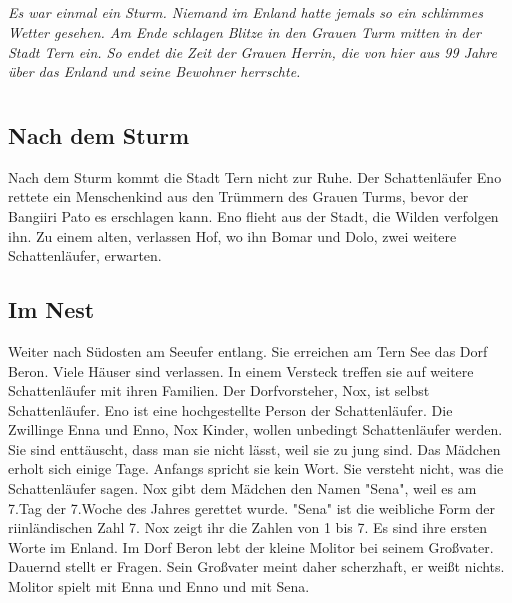 \documentclass[12pt,a4paper,onecolumn,twoside,ngerman]{book}
\newcommand{\Tern}{Tern}
\newcommand{\Beron}{Beron}
\newcommand{\Molitor}{Molitor}
\newcommand{\Sena}{Sena}
\newcommand{\Bangiri}{Bangiiri}
\newcommand{\Pato}{Pato}
\newcommand{\Enland}{Enland}
\newcommand{\Schattenlaufer}{Schattenläufer}
\newcommand{\Eno}{Eno}
\newcommand{\Bomar}{Bomar}
\newcommand{\Dolo}{Dolo}
\newcommand{\Nox}{Nox}
\newcommand{\Enna}{Enna}
\newcommand{\Enno}{Enno}
\begin{document}
  
  
  
  \tableofcontents
  
  \clearpage{\pagestyle{empty}\cleardoublepage}
  
  \raggedright 
  


\paragraph{}
\textit{Es war einmal ein Sturm.
Niemand im {\Enland} hatte jemals so ein schlimmes Wetter gesehen.
Am Ende schlagen Blitze in den Grauen Turm mitten in der Stadt {\Tern} ein.
So endet die Zeit der Grauen Herrin, die von hier aus 99 Jahre über das {\Enland} und seine Bewohner herrschte.
}

\chapter{}
\section{Nach dem Sturm}
Nach dem Sturm kommt die Stadt {\Tern} nicht zur Ruhe.\linebreak
Der {\Schattenlaufer} {\Eno} rettete ein Menschenkind aus den Trümmern des Grauen Turms, bevor der {\Bangiri} {\Pato} es erschlagen kann. {\Eno} flieht aus der Stadt, die Wilden verfolgen ihn. Zu einem alten, verlassen Hof, wo ihn {\Bomar} und {\Dolo}, zwei weitere {\Schattenlaufer}, erwarten. 

\section{Im Nest}
Weiter nach Südosten am Seeufer entlang. Sie erreichen am {\Tern} See das Dorf {\Beron}. Viele Häuser sind verlassen. In einem Versteck treffen sie auf weitere {\Schattenlaufer} mit ihren Familien. Der Dorfvorsteher, {\Nox}, ist selbst {\Schattenlaufer}. {\Eno} ist eine hochgestellte Person der {\Schattenlaufer}.\linebreak
Die Zwillinge {\Enna} und {\Enno}, {\Nox} Kinder, wollen unbedingt {\Schattenlaufer} werden. Sie sind enttäuscht, dass man sie nicht lässt, weil sie zu jung sind. Das Mädchen erholt sich einige Tage. Anfangs spricht sie kein Wort. Sie versteht nicht, was die {\Schattenlaufer} sagen.\linebreak
{\Nox} gibt dem Mädchen den Namen "{\Sena}", weil es am 7.Tag der 7.Woche des Jahres gerettet wurde. "{\Sena}" ist die weibliche Form der riinländischen Zahl 7. {\Nox} zeigt ihr die Zahlen von 1 bis 7. Es sind ihre ersten Worte im {\Enland}.\linebreak
Im Dorf {\Beron} lebt der kleine {\Molitor} bei seinem Großvater. Dauernd stellt er Fragen. Sein Großvater meint daher scherzhaft, er weißt nichts. {\Molitor} spielt mit {\Enna} und {\Enno} und mit {\Sena}. 
\end{document}
